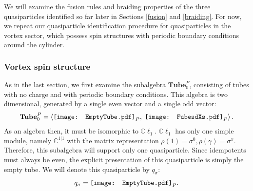 \documentclass[12pt,a4paper]{article}
\newcommand{\cc}{\mathbb{C}}
\newcommand\be            {\begin{equation}}
\newcommand\ee            {\end{equation}}
\newcommand{\cl}{\mathbb{C}\ell}
\newcommand{\fube}{\textbf{Tube}}
\newcommand{\tube}{\textbf{Tube}}
\newcommand{\fld}{\mathcal{F}} %
\newcommand{\FubeXXX}{\mathord{\vcenter{\hbox{\texttt{[image: EmptyTube.pdf]}}}}}
\newcommand{\FubesdXs}{\mathord{\vcenter{\hbox{\texttt{[image: FubesdXs.pdf]}}}}}
\begin{document}
We will examine the fusion rules and braiding properties of the three quasiparticles identified so far later in Sections \ref{fusion} and \ref{braiding}. For now, we repeat our quasiparticle identification procedure for quasiparticles in the vortex sector, which possess spin structures with periodic boundary conditions around the cylinder. 

\subsubsection{Vortex spin structure}

As in the last section, we first examine the subalgebra $\tube^P_0$, consisting of tubes with no charge and with periodic boundary conditions. This algebra is two dimensional, generated by a single even vector and a single odd vector: 
\be \tube^P_0 = \left\langle \FubeXXX_P,\; \FubesdXs_P\right\rangle.\ee
As an algebra then, it must be isomorphic to $\cl_1$. 
$\cl_1$ has only one simple module, namely $\cc^{1|1}$ with the matrix representation $\rho(1) = \sigma^0,\rho(\gamma)=\sigma^x$. Therefore, this subalgebra will support only one quasiparticle. Since idempotents must always be even, the explicit presentation of this quasiparticle is simply the empty tube. We will denote this quasiparticle by $q_\sigma$:
\be q_\sigma = \FubeXXX_P.\ee
\end{document}
